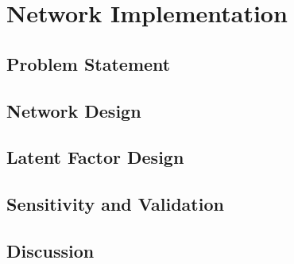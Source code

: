 
\chapter{Network Implementation}
\label{ch:implement}

\section{Problem Statement}
\label{sec:prob}

\section{Network Design}
\label{sec:networkd}

\section{Latent Factor Design}
\label{sec:factord}

\section{Sensitivity and Validation}
\label{sec:valid}

\section{Discussion}
\label{sec:discuss04}